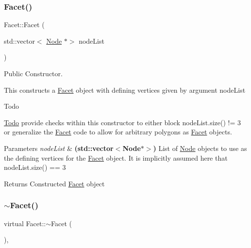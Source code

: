 \subsubsection{\texorpdfstring{Facet()}{Facet()}\hspace{0.1cm}{\footnotesize\ttfamily [2/2]}}
{\footnotesize\ttfamily Facet\+::\+Facet (\begin{DoxyParamCaption}\item[{std\+::vector$<$ \mbox{\hyperlink{class_node}{Node}} $\ast$$>$}]{node\+List }\end{DoxyParamCaption})}



Public Constructor. 

This constructs a \mbox{\hyperlink{class_facet}{Facet}} object with defining vertices given by argument node\+List \begin{DoxyRefDesc}{Todo}
\item[\mbox{\hyperlink{todo__todo000009}{Todo}}]provide checks within this constructor to either block node\+List.\+size() != 3 or generalize the \mbox{\hyperlink{class_facet}{Facet}} code to allow for arbitrary polygons as \mbox{\hyperlink{class_facet}{Facet}} objects. \end{DoxyRefDesc}

\begin{DoxyParams}{Parameters}
{\em node\+List} & {\bfseries (std\+::vector$<$\+Node$\ast$$>$)} List of \mbox{\hyperlink{class_node}{Node}} objects to use as the defining vertices for the \mbox{\hyperlink{class_facet}{Facet}} object. It is implicitly assumed here that node\+List.\+size() == 3 \\
\hline
\end{DoxyParams}
\begin{DoxyReturn}{Returns}
Constructed \mbox{\hyperlink{class_facet}{Facet}} object 
\end{DoxyReturn}
\mbox{\label{class_facet_af40042b9ad6c5a03127034f9d1c1e786}} 
\subsubsection{\texorpdfstring{$\sim$\+Facet()}{~Facet()}}
{\footnotesize\ttfamily virtual Facet\+::$\sim$\+Facet (\begin{DoxyParamCaption}{ }\end{DoxyParamCaption})\hspace{0.3cm}{\ttfamily [inline]}, {\ttfamily [virtual]}}



